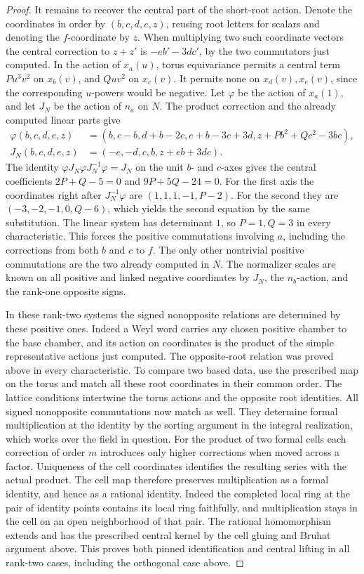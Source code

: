 \documentclass[11pt,a4paper,openany,oneside]{book}
\theoremstyle{resultstyle}
\theoremstyle{definition}
\numberwithin{equation}{chapter}
\begin{document}
\begin{proof}
It remains to recover the central part of the short-root
action. Denote the coordinates in order by \((b,c,d,e,z)\),
reusing root letters for scalars and denoting the \(f\)-coordinate
by \(z\). When multiplying two such coordinate vectors the
central correction to \(z+z'\) is \(-eb'-3dc'\),
by the two commutators just computed. In the action of
\(x_a(u)\), torus equivariance permits a central term
\(Pu^3v^2\) on \(x_b(v)\), and \(Quv^2\) on \(x_c(v)\).
It permits none on \(x_d(v),x_e(v)\), since the corresponding
\(u\)-powers would be negative. Let \(\varphi\) be the action
of \(x_a(1)\), and let \(J_N\) be the action of \(n_a\) on \(N\).
The product correction and the already computed linear parts
give
\[
 \begin{split}
 \varphi(b,c,d,e,z)&=(b,c-b,d+b-2c,e+b-3c+3d,
                      z+Pb^2+Qc^2-3bc),\\
 J_N(b,c,d,e,z)&=(-e,-d,c,b,z+eb+3dc).
 \end{split}
\]
The identity \(\varphi J_N\varphi J_N^{-1}\varphi=J_N\)
on the unit \(b\)- and \(c\)-axes gives the central
coefficients \(2P+Q-5=0\) and \(9P+5Q-24=0\).
For the first axis the coordinates right after
\(J_N^{-1}\varphi\) are \((1,1,1,-1,P-2)\).
For the second they are \((-3,-2,-1,0,Q-6)\),
which yields the second equation by the same substitution.
The linear system has determinant \(1\), so \(P=1,Q=3\)
in every characteristic. This forces the positive
commutations involving \(a\), including the corrections
from both \(b\) and \(c\) to \(f\). The only other
nontrivial positive commutations are the two already
computed in \(N\). The normalizer scales are known on
all positive and linked negative coordinates by \(J_N\),
the \(n_b\)-action, and the rank-one opposite signs.

In these rank-two systems the signed nonopposite relations are determined
by these positive ones. Indeed a Weyl word carries any
chosen positive chamber to the base chamber, and its action
on coordinates is the product of the simple representative
actions just computed. The opposite-root relation was
proved above in every characteristic. To compare two based
data, use the prescribed map on the torus and match all
these root coordinates in their common order. The lattice
conditions intertwine the torus actions and the opposite
root identities. All signed nonopposite commutations now
match as well. They determine formal multiplication at the
identity by the sorting argument in the integral realization,
which works over the field in question. For the product of
two formal cells each correction of order \(m\) introduces
only higher corrections when moved across a factor. Uniqueness
of the cell coordinates identifies the resulting series with
the actual product. The cell map therefore preserves
multiplication as a formal identity, and hence as a rational
identity. Indeed the completed local ring at the pair of
identity points contains its local ring faithfully, and
multiplication stays in the cell on an open neighborhood
of that pair. The rational homomorphism extends and has
the prescribed central kernel by the cell gluing and Bruhat
argument above. This proves both pinned identification and
central lifting in all rank-two cases, including the orthogonal case above.


\end{proof}
\end{document}
